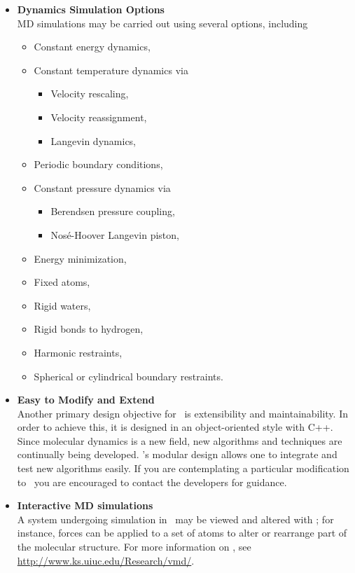 \begin{itemize}
\item{\bf Dynamics Simulation Options}\\
MD simulations may be carried out using several options, including
\begin{itemize}
  \item Constant energy dynamics,
  \item Constant temperature dynamics via
  \begin{itemize}
    \item Velocity rescaling,
    \item Velocity reassignment,
    \item Langevin dynamics,
  \end{itemize}
  \item Periodic boundary conditions,
  \item Constant pressure dynamics via
  \begin{itemize}
    \item Berendsen pressure coupling,
    \item Nos\'{e}-Hoover Langevin piston,
  \end{itemize}
  \item Energy minimization,
  \item Fixed atoms,
  \item Rigid waters,
  \item Rigid bonds to hydrogen,
  \item Harmonic restraints,
  \item Spherical or cylindrical boundary restraints.
\end{itemize}

\item{\bf Easy to Modify and Extend}\\
Another primary design objective for \NAMD\ is extensibility and 
maintainability. In order to achieve this, it is designed in an 
object-oriented style with C++. Since molecular dynamics is a new field,
new algorithms and techniques are continually being developed.
\NAMD's modular design allows one to integrate and test new algorithms 
easily.  If you are contemplating a particular modification to \NAMD\
you are encouraged to contact the developers for guidance.

\item{\bf Interactive MD simulations}\\
A system undergoing simulation in \NAMD\ may be viewed and
altered with \VMD; for instance, forces can be applied to a set of atoms
to alter or rearrange part of the molecular structure.  For more information
on \VMD, see \url{http://www.ks.uiuc.edu/Research/vmd/}.  


\end{itemize}
